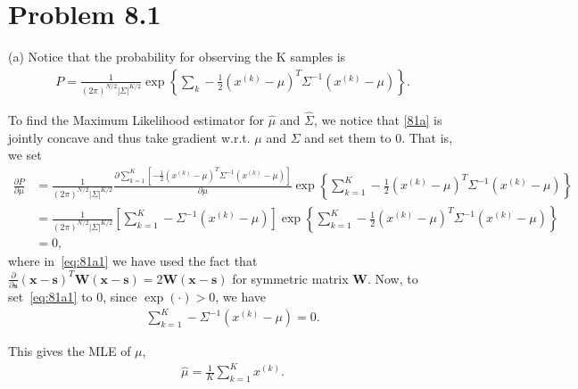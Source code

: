 \documentclass{article}
\newcommand{\bm}{\mathbf}
\begin{document}
\section*{Problem 8.1}
(a) Notice that the probability for observing the K samples is
\begin{align}
	P = \frac{1}{(2\pi)^{N/2}|\Sigma|^{K/2}}\exp\left\{\sum_k -\frac{1}{2}(x^{(k)}-\mu)^T\Sigma^{-1}(x^{(k)}-\mu)\right\}. \label{81a}
\end{align}

To find the Maximum Likelihood estimator for $\hat{\mu}$ and $\hat{\Sigma}$,
we notice that \eqref{81a} is jointly concave and thus take
gradient w.r.t. $\mu$ and $\Sigma$ and set them to 0. That is, we set
%
\begin{align}
\frac{\partial P}{\partial \mu} &=
\frac{1}{(2\pi)^{N/2}|\Sigma|^{K/2}} \frac{\partial \sum_{k=1}^K\left[-\frac{1}{2}(x^{(k)}-\mu)^T\Sigma^{-1}(x^{(k)}-\mu)\right]}{\partial \mu} \exp\left\{\sum_{k=1}^K -\frac{1}{2}(x^{(k)}-\mu)^T\Sigma^{-1}(x^{(k)}-\mu)\right\} \\
&=\frac{1}{(2\pi)^{N/2}|\Sigma|^{K/2}} \left[\sum_{k=1}^K-\Sigma^{-1}(x^{(k)} - \mu)\right] \exp\left\{\sum_{k=1}^K -\frac{1}{2}(x^{(k)}-\mu)^T\Sigma^{-1}(x^{(k)}-\mu)\right\} \label{eq:81a1}\\
&= 0,
\end{align}
where in~\eqref{eq:81a1} we have used the fact that $\frac{\partial}{\partial\bm{s}}(\bm{x}-\bm{s})^T\bm{W}(\bm{x}-\bm{s}) = 2\bm{W}(\bm{x}-\bm{s})$
for symmetric matrix $\bm{W}$. Now, to set~\eqref{eq:81a1} to 0, since
$\exp(\cdot) > 0$, we have
\begin{align}
	\sum_{k=1}^K-\Sigma^{-1}(x^{(k)} - \mu) = 0.
\end{align}

This gives the MLE of $\mu$,
\begin{align}
	\hat{\mu} = \frac{1}{{K}}{\sum_{k=1}^K x^{(k)}}.
\end{align}
\end{document}
